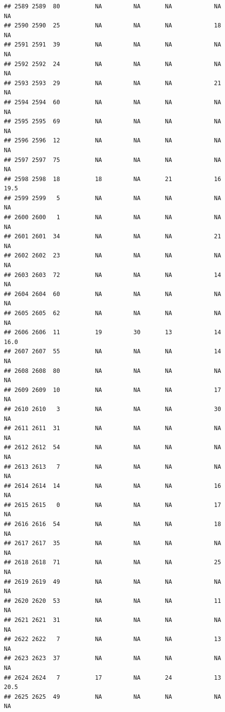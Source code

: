 \documentclass[man]{apa6}
\begin{document}
\begin{verbatim}
## 2589 2589  80          NA         NA       NA            NA       NA
## 2590 2590  25          NA         NA       NA            18       NA
## 2591 2591  39          NA         NA       NA            NA       NA
## 2592 2592  24          NA         NA       NA            NA       NA
## 2593 2593  29          NA         NA       NA            21       NA
## 2594 2594  60          NA         NA       NA            NA       NA
## 2595 2595  69          NA         NA       NA            NA       NA
## 2596 2596  12          NA         NA       NA            NA       NA
## 2597 2597  75          NA         NA       NA            NA       NA
## 2598 2598  18          18         NA       21            16     19.5
## 2599 2599   5          NA         NA       NA            NA       NA
## 2600 2600   1          NA         NA       NA            NA       NA
## 2601 2601  34          NA         NA       NA            21       NA
## 2602 2602  23          NA         NA       NA            NA       NA
## 2603 2603  72          NA         NA       NA            14       NA
## 2604 2604  60          NA         NA       NA            NA       NA
## 2605 2605  62          NA         NA       NA            NA       NA
## 2606 2606  11          19         30       13            14     16.0
## 2607 2607  55          NA         NA       NA            14       NA
## 2608 2608  80          NA         NA       NA            NA       NA
## 2609 2609  10          NA         NA       NA            17       NA
## 2610 2610   3          NA         NA       NA            30       NA
## 2611 2611  31          NA         NA       NA            NA       NA
## 2612 2612  54          NA         NA       NA            NA       NA
## 2613 2613   7          NA         NA       NA            NA       NA
## 2614 2614  14          NA         NA       NA            16       NA
## 2615 2615   0          NA         NA       NA            17       NA
## 2616 2616  54          NA         NA       NA            18       NA
## 2617 2617  35          NA         NA       NA            NA       NA
## 2618 2618  71          NA         NA       NA            25       NA
## 2619 2619  49          NA         NA       NA            NA       NA
## 2620 2620  53          NA         NA       NA            11       NA
## 2621 2621  31          NA         NA       NA            NA       NA
## 2622 2622   7          NA         NA       NA            13       NA
## 2623 2623  37          NA         NA       NA            NA       NA
## 2624 2624   7          17         NA       24            13     20.5
## 2625 2625  49          NA         NA       NA            NA       NA

\end{verbatim}
\end{document}
